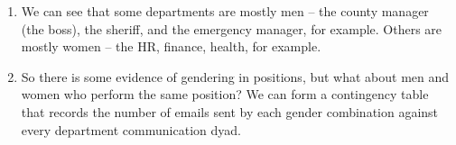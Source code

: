 \documentclass[fleqn]{MJDArticle}
\begin{document}
\begin{enumerate}
	\item We can see that some departments are mostly men -- the county manager (the boss), the sheriff, and the emergency manager, for example. Others are mostly women -- the HR, finance, health, for example. 
	\item So there is some evidence of gendering in positions, but what about men and women who perform the same position? We can form a contingency table that records the number of emails sent by each gender combination against every department communication dyad.
%
%
%
	

\end{enumerate}
\end{document}
